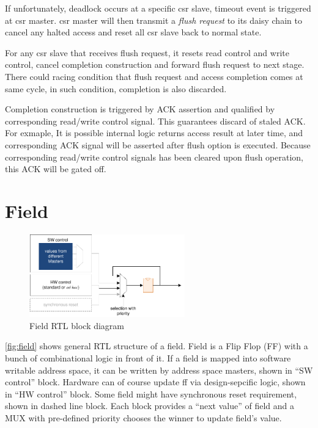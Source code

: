 \documentclass[10pt,oneside]{book}
\begin{document}
If unfortunately, deadlock occurs at a specific \gls{csr slave}, 
timeout event is triggered at \gls{csr master}. \gls{csr master}
will then transmit a \emph{flush request} to its daisy chain to 
cancel any halted access and reset all \gls{csr slave} back to normal
state. 

For any \gls{csr slave} that receives flush request, it resets read control
and write control, cancel completion construction and forward flush request 
to next stage. There could racing condition that flush request and 
access completion comes at same cycle, in such condition, completion is 
also discarded. 

Completion construction is triggered by ACK assertion and qualified
by corresponding read/write control signal. This guarantees discard of 
staled ACK. 
For exmaple, 
It is possible internal logic returns access result at later time, and 
corresponding ACK signal will be asserted after flush option is executed. 
Because corresponding read/write control signals has been cleared upon 
flush operation, this ACK will be gated off. 




\section{Field}
\begin{figure}[bthp]
  \centering
  \includegraphics[width=0.6\textwidth]{field}
  \caption{Field RTL block diagram}\label{fig:field}
\end{figure}

\autoref{fig:field} shows general RTL structure of a \gls{field}. 
Field is a Flip Flop (FF) with a bunch of combinational logic in
front of it. If a \gls{field} is mapped into software writable
address space, it can be written by address space \gls{master}s, 
shown in ``SW control'' block.
Hardware can of course update \gls{ff} via design-sepcific logic, 
shown in ``HW control'' block. 
Some field might have synchronous reset requirement, shown 
in dashed line block. 
Each block provides a ``next value'' of field and a MUX with 
pre-defined priority chooses the winner to update field's value.
\end{document}
